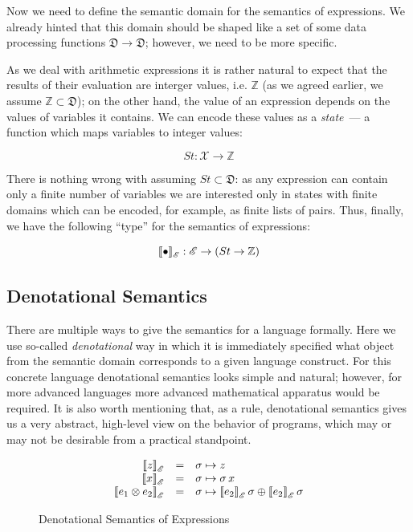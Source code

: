 Now we need to define the semantic domain for the semantics of expressions. We already hinted that this domain should be shaped like a set of some
data processing functions $\mathfrak{D}\to\mathfrak{D}$; however, we need to be more specific.

As we deal with arithmetic expressions it is rather natural to expect that the results of their evaluation are interger values, i.e. $\mathbb{Z}$ (as we agreed
earlier, we assume $\mathbb{Z}\subset\mathfrak{D}$); on the other hand, the value of an expression depends on the values of variables it contains. We can
encode these values as a \emph{state}~--- a function which maps variables to integer values:

\[
St : \mathscr{X} \to \mathbb{Z}
\]

There is nothing wrong with assuming $St\subset\mathfrak{D}$: as any expression can contain only a finite number of variables we are interested only in
states with finite domains which can be encoded, for example, as finite lists of pairs. Thus, finally, we have the following ``type'' for the semantics
of expressions:

\[
\sembr{\bullet}^\ph_\mathscr{E}:\mathscr{E}\to(St\to\mathbb{Z})
\]

\subsection{Denotational Semantics}

There are multiple ways to give the semantics for a language formally. Here we use so-called \emph{denotational} way in which it is immediately
specified what object from the semantic domain corresponds to a given language construct. For this concrete language denotational semantics
looks simple and natural; however, for more advanced languages more advanced mathematical apparatus would be required. It is also worth mentioning that,
as a rule, denotational semantics gives us a very abstract, high-level view on the behavior of programs, which may or may not be desirable from a
practical standpoint.


\begin{figure}[t]
\[
\begin{array}{rcl}
  \sembr{z}^\ph_\mathscr{E} & = & \sigma \mapsto z \\  
  \sembr{x}^\ph_\mathscr{E} & = & \sigma \mapsto \sigma\,x \\
  \sembr{e_1\otimes e_2}^\ph_\mathscr{E} & = & \sigma \mapsto \sembr{e_2}^\ph_\mathscr{E}\,\sigma\oplus\sembr{e_2}^\ph_\mathscr{E}\,\sigma
\end{array}
\]
\caption{Denotational Semantics of Expressions}
\label{se-denot}
\end{figure}


